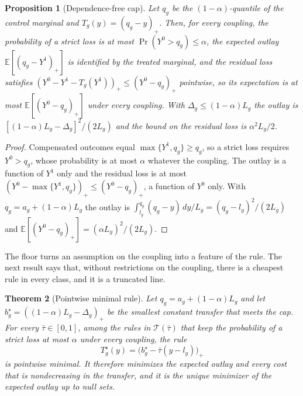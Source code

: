 \documentclass[11pt,a4paper]{article}
\theoremstyle{notesplain}
\newtheorem{theorem}{Theorem}[section]
\newtheorem{proposition}[theorem]{Proposition}
\theoremstyle{notesupright}
\numberwithin{equation}{section}
\newcommand{\E}{\mathbb{E}}
\begin{document}
\begin{proposition}[Dependence-free cap]
\label{prop:floor}
Let $q_g$ be the $(1-\alpha)$-quantile of the control marginal and $T_g(y)=(q_g-y)_+$. Then, for every coupling, the probability of a strict loss is at most $\Pr(Y^0>q_g)\le\alpha$, the expected outlay $\E[(q_g-Y^1)_+]$ is identified by the treated marginal, and the residual loss satisfies $(Y^0-Y^1-T_g(Y^1))_+\le(Y^0-q_g)_+$ pointwise, so its expectation is at most $\E[(Y^0-q_g)_+]$ under every coupling. With $\Delta_g\le(1-\alpha)L_g$ the outlay is $[(1-\alpha)L_g-\Delta_g]^2/(2L_g)$ and the bound on the residual loss is $\alpha^2L_g/2$.
\end{proposition}

\begin{proof}
Compensated outcomes equal $\max\{Y^1,q_g\}\ge q_g$, so a strict loss requires $Y^0>q_g$, whose probability is at most $\alpha$ whatever the coupling. The outlay is a function of $Y^1$ only and the residual loss is at most $(Y^0-\max\{Y^1,q_g\})_+\le(Y^0-q_g)_+$, a function of $Y^0$ only. With $q_g=a_g+(1-\alpha)L_g$ the outlay is $\int_{l_g}^{q_g}(q_g-y)\,dy/L_g=(q_g-l_g)^2/(2L_g)$ and $\E[(Y^0-q_g)_+]=(\alpha L_g)^2/(2L_g)$.
\end{proof}

The floor turns an assumption on the coupling into a feature of the rule. The next result says that, without restrictions on the coupling, there is a cheapest rule in every class, and it is a truncated line.

\begin{theorem}[Pointwise minimal rule]
\label{thm:minimal}
Let $q_g=a_g+(1-\alpha)L_g$ and let $b^\star_g=((1-\alpha)L_g-\Delta_g)_+$ be the smallest constant transfer that meets the cap. For every $\bar\tau\in[0,1]$, among the rules in $\mathcal T(\bar\tau)$ that keep the probability of a strict loss at most $\alpha$ under every coupling, the rule
\begin{equation}
T^\star_g(y)=\big(b^\star_g-\bar\tau(y-l_g)\big)_+
\label{eq:minimal}
\end{equation}
is pointwise minimal. It therefore minimizes the expected outlay and every cost that is nondecreasing in the transfer, and it is the unique minimizer of the expected outlay up to null sets.
\end{theorem}
\end{document}
